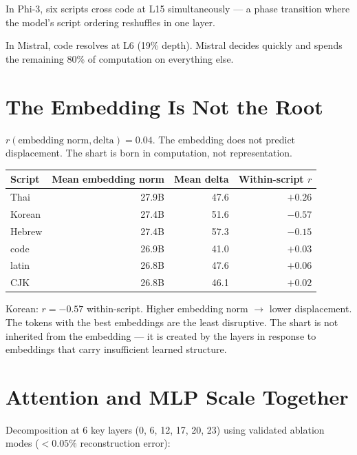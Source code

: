 \documentclass[11pt,a4paper]{article}
\begin{document}
In Phi-3, six scripts cross code at L15 simultaneously --- a phase transition where the model's script ordering reshuffles in one layer.

In Mistral, code resolves at L6 (19\% depth). Mistral decides quickly and spends the remaining 80\% of computation on everything else.

\section{The Embedding Is Not the Root}

$r(\text{embedding norm}, \text{delta}) = 0.04$. The embedding does not predict displacement. The shart is born in computation, not representation.

\begin{center}
\begin{tabular}{lrrr}
\toprule
\textbf{Script} & \textbf{Mean embedding norm} & \textbf{Mean delta} & \textbf{Within-script $r$} \\
\midrule
Thai & 27.9B & 47.6 & $+0.26$ \\
Korean & 27.4B & 51.6 & $-0.57$ \\
Hebrew & 27.4B & 57.3 & $-0.15$ \\
code & 26.9B & 41.0 & $+0.03$ \\
latin & 26.8B & 47.6 & $+0.06$ \\
CJK & 26.8B & 46.1 & $+0.02$ \\
\bottomrule
\end{tabular}
\end{center}

Korean: $r = -0.57$ within-script. Higher embedding norm $\to$ lower displacement. The tokens with the best embeddings are the least disruptive. The shart is not inherited from the embedding --- it is created by the layers in response to embeddings that carry insufficient learned structure.

\section{Attention and MLP Scale Together}

Decomposition at 6 key layers (0, 6, 12, 17, 20, 23) using validated ablation modes ($< 0.05\%$ reconstruction error):
\end{document}
